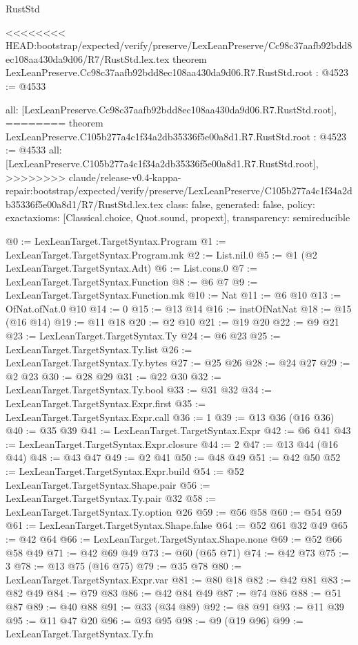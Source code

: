 \begin{lexlean}{RustStd}
\begin{coremodule}
{\begin{coremodule}
{{{{{{{{{{}
<<<<<<<< HEAD:bootstrap/expected/verify/preserve/LexLeanPreserve/Cc98c37aafb92bdd8ec108aa430da9d06/R7/RustStd.lex.tex
theorem LexLeanPreserve.Cc98c37aafb92bdd8ec108aa430da9d06.R7.RustStd.root : @4523 := @4533 {
  all: [LexLeanPreserve.Cc98c37aafb92bdd8ec108aa430da9d06.R7.RustStd.root],
========
theorem LexLeanPreserve.C105b277a4c1f34a2db35336f5e00a8d1.R7.RustStd.root : @4523 := @4533 {
  all: [LexLeanPreserve.C105b277a4c1f34a2db35336f5e00a8d1.R7.RustStd.root],
>>>>>>>> claude/release-v0.4-kappa-repair:bootstrap/expected/verify/preserve/LexLeanPreserve/C105b277a4c1f34a2db35336f5e00a8d1/R7/RustStd.lex.tex
  class: false,
  generated: false,
  policy: exact{axioms: [Classical.choice, Quot.sound, propext]},
  transparency: semireducible
}

@0 := LexLeanTarget.TargetSyntax.Program
@1 := LexLeanTarget.TargetSyntax.Program.mk
@2 := List.nil.{0}
@5 := @1 (@2 LexLeanTarget.TargetSyntax.Adt)
@6 := List.cons.{0}
@7 := LexLeanTarget.TargetSyntax.Function
@8 := @6 @7
@9 := LexLeanTarget.TargetSyntax.Function.mk
@10 := Nat
@11 := @6 @10
@13 := OfNat.ofNat.{0} @10
@14 := 0
@15 := @13 @14
@16 := instOfNatNat
@18 := @15 (@16 @14)
@19 := @11 @18
@20 := @2 @10
@21 := @19 @20
@22 := @9 @21
@23 := LexLeanTarget.TargetSyntax.Ty
@24 := @6 @23
@25 := LexLeanTarget.TargetSyntax.Ty.list
@26 := LexLeanTarget.TargetSyntax.Ty.bytes
@27 := @25 @26
@28 := @24 @27
@29 := @2 @23
@30 := @28 @29
@31 := @22 @30
@32 := LexLeanTarget.TargetSyntax.Ty.bool
@33 := @31 @32
@34 := LexLeanTarget.TargetSyntax.Expr.first
@35 := LexLeanTarget.TargetSyntax.Expr.call
@36 := 1
@39 := @13 @36 (@16 @36)
@40 := @35 @39
@41 := LexLeanTarget.TargetSyntax.Expr
@42 := @6 @41
@43 := LexLeanTarget.TargetSyntax.Expr.closure
@44 := 2
@47 := @13 @44 (@16 @44)
@48 := @43 @47
@49 := @2 @41
@50 := @48 @49
@51 := @42 @50
@52 := LexLeanTarget.TargetSyntax.Expr.build
@54 := @52 LexLeanTarget.TargetSyntax.Shape.pair
@56 := LexLeanTarget.TargetSyntax.Ty.pair @32
@58 := LexLeanTarget.TargetSyntax.Ty.option @26
@59 := @56 @58
@60 := @54 @59
@61 := LexLeanTarget.TargetSyntax.Shape.false
@64 := @52 @61 @32 @49
@65 := @42 @64
@66 := LexLeanTarget.TargetSyntax.Shape.none
@69 := @52 @66 @58 @49
@71 := @42 @69 @49
@73 := @60 (@65 @71)
@74 := @42 @73
@75 := 3
@78 := @13 @75 (@16 @75)
@79 := @35 @78
@80 := LexLeanTarget.TargetSyntax.Expr.var
@81 := @80 @18
@82 := @42 @81
@83 := @82 @49
@84 := @79 @83
@86 := @42 @84 @49
@87 := @74 @86
@88 := @51 @87
@89 := @40 @88
@91 := @33 (@34 @89)
@92 := @8 @91
@93 := @11 @39
@95 := @11 @47 @20
@96 := @93 @95
@98 := @9 (@19 @96)
@99 := LexLeanTarget.TargetSyntax.Ty.fn
}}}}}}}}}}
\end{coremodule}}
\end{coremodule}
\end{lexlean}

